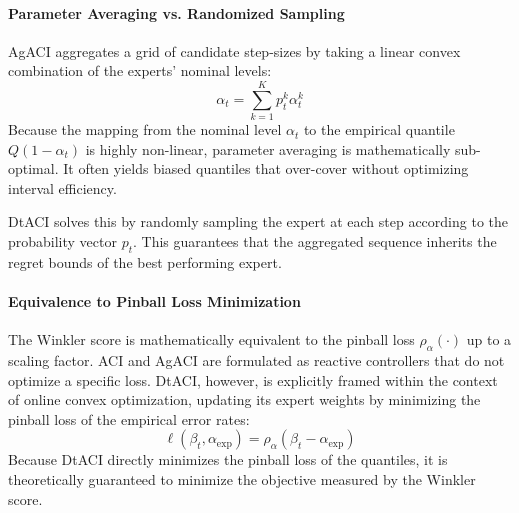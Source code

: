 \paragraph{Parameter Averaging vs. Randomized Sampling}
AgACI aggregates a grid of candidate step-sizes by taking a linear convex combination of the experts' nominal levels:
\begin{equation}
	\alpha_t = \sum_{k=1}^K p_t^k \alpha_t^k
\end{equation}
Because the mapping from the nominal level \(\alpha_t\) to the empirical quantile \(Q(1-\alpha_t)\) is highly non-linear, parameter averaging is mathematically sub-optimal. It often yields biased quantiles that over-cover without optimizing interval efficiency.

DtACI solves this by randomly sampling the expert at each step according to the probability vector \(p_t\). This guarantees that the aggregated sequence inherits the regret bounds of the best performing expert.

\paragraph{Equivalence to Pinball Loss Minimization}
The Winkler score is mathematically equivalent to the pinball loss \(\rho_\alpha(\cdot)\) up to a scaling factor. ACI and AgACI are formulated as reactive controllers that do not optimize a specific loss. DtACI, however, is explicitly framed within the context of online convex optimization, updating its expert weights by minimizing the pinball loss of the empirical error rates:
\begin{equation}
	\ell(\beta_t, \alpha_{\text{exp}}) = \rho_\alpha(\beta_t - \alpha_{\text{exp}})
\end{equation}
Because DtACI directly minimizes the pinball loss of the quantiles, it is theoretically guaranteed to minimize the objective measured by the Winkler score.
